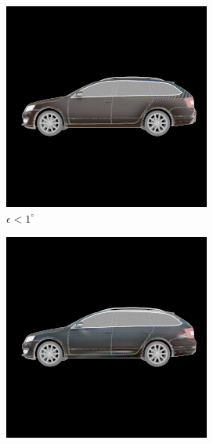 \begin{figure}
    \centering
    \caption{Increasing the noise $\epsilon$ in the pose estimation during training
        preserves the quality of the textures learned by the model. However, if the
        model and dataset pose distributions are non-overlapping, the discriminator
        experiences \emph{mode collapse}.}
    \label{fig:pose-vary-1}
    \vspace{0.2in}
    \begin{subfigure}[t]{0.19\linewidth}
        \centering
      \includegraphics[width=\linewidth]{graphics/pose_1.png}
        \caption{$\epsilon < 1^\circ$}
    \end{subfigure}
    \begin{subfigure}[t]{0.19\linewidth}
        \centering
       \includegraphics[width=\linewidth]{graphics/pose_2.png}

\end{subfigure}
\end{figure}
